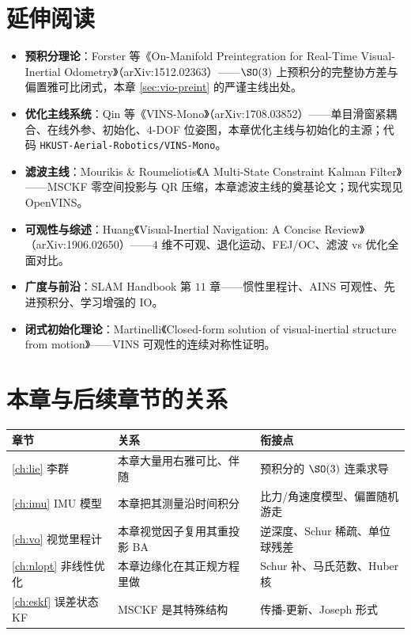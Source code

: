 \section*{延伸阅读}
\begin{itemize}
  \item \textbf{预积分理论}：Forster 等《On-Manifold Preintegration for Real-Time Visual-Inertial Odometry》\cite{forster2017preintegration}（arXiv:1512.02363）——$\SO(3)$ 上预积分的完整协方差与偏置雅可比闭式，本章 \cref{sec:vio-preint} 的严谨主线出处。
  \item \textbf{优化主线系统}：Qin 等《VINS-Mono》\cite{qin2018vins}（arXiv:1708.03852）——单目滑窗紧耦合、在线外参、初始化、$4$-DOF 位姿图，本章优化主线与初始化的主源；代码 \texttt{HKUST-Aerial-Robotics/VINS-Mono}。
  \item \textbf{滤波主线}：Mourikis \& Roumeliotis《A Multi-State Constraint Kalman Filter》\cite{mourikis2007msckf}——MSCKF 零空间投影与 QR 压缩，本章滤波主线的奠基论文；现代实现见 OpenVINS。
  \item \textbf{可观性与综述}：Huang《Visual-Inertial Navigation: A Concise Review》\cite{huang2019vins}（arXiv:1906.02650）——$4$ 维不可观、退化运动、FEJ/OC、滤波 vs 优化全面对比。
  \item \textbf{广度与前沿}：SLAM Handbook 第 $11$ 章\cite{carlone2026handbook}——惯性里程计、AINS 可观性、先进预积分、学习增强的 IO。
  \item \textbf{闭式初始化理论}：Martinelli《Closed-form solution of visual-inertial structure from motion》\cite{martinelli2014closed}——VINS 可观性的连续对称性证明。
\end{itemize}

\section*{本章与后续章节的关系}
\begin{table}[H]\centering\small
\begin{tabular}{lll}
\toprule
章节 & 关系 & 衔接点 \\
\midrule
\cref{ch:lie} 李群 & 本章大量用右雅可比、伴随 & 预积分的 $\SO(3)$ 连乘求导 \\
\cref{ch:imu} IMU 模型 & 本章把其测量沿时间积分 & 比力/角速度模型、偏置随机游走 \\
\cref{ch:vo} 视觉里程计 & 本章视觉因子复用其重投影 BA & 逆深度、Schur 稀疏、单位球残差 \\
\cref{ch:nlopt} 非线性优化 & 本章边缘化在其正规方程里做 & Schur 补、马氏范数、Huber 核 \\
\cref{ch:eskf} 误差状态 KF & MSCKF 是其特殊结构 & 传播-更新、Joseph 形式 \\
\bottomrule
\end{tabular}
\end{table}

